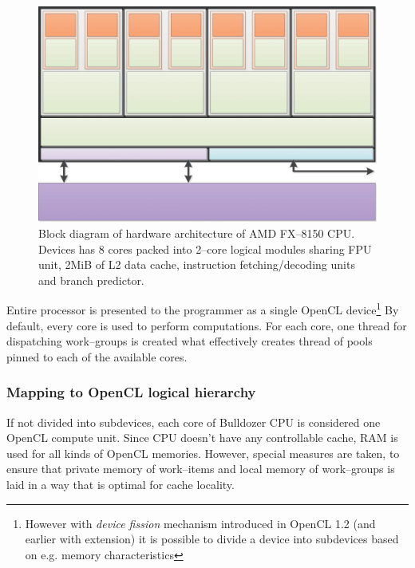 \begin{figure}[htb]
  \begin{center}
    \includegraphics[width=\textwidth]{chapters/opencl/bulldozer.png}
  \end{center}
  \caption{Block diagram of hardware architecture of AMD FX--8150 CPU. Devices
    has 8 cores packed into 2--core logical modules sharing FPU unit, 2MiB of
    L2 data cache, instruction fetching/decoding units and branch predictor.}
  \label{fig:bulldozerarch}
\end{figure}

Entire processor is presented to the programmer as a single OpenCL
device\footnote{However with \emph{device fission} mechanism introduced in OpenCL 1.2 (and
earlier with extension) it is possible to divide a device into subdevices based on e.g. memory characteristics}
By default, every core is used to perform computations. For each core, one
thread for dispatching work--groups is created what effectively creates thread
of pools pinned to each of the available cores.

\subsubsection{Mapping to OpenCL logical hierarchy}
If not divided into subdevices, each core of Bulldozer CPU is considered one
OpenCL compute unit. Since CPU doesn't have any controllable cache, RAM is used
for all kinds of OpenCL memories. However, special measures are taken, to ensure
that private memory of work--items and local memory of work--groups is
laid in a way that is optimal for cache locality.
